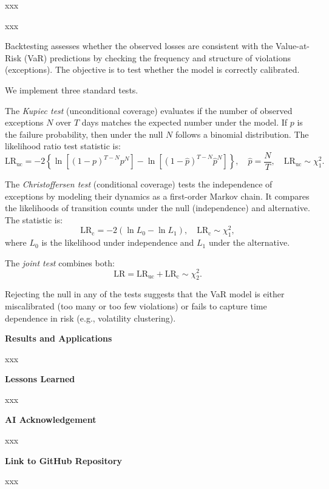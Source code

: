 \documentclass[12pt]{article}
\begin{document}
\vspace{1em}
\underline{}

\vspace{0.6em}

xxx

\vspace{1em}
\underline{}

\vspace{0.6em}

xxx

\vspace{1em}
\underline{}

\vspace{0.6em}

Backtesting assesses whether the observed losses are consistent with the Value-at-Risk (VaR) predictions by checking the frequency and structure of violations (exceptions). The objective is to test whether the model is correctly calibrated.

We implement three standard tests.

The \textit{Kupiec test} (unconditional coverage) evaluates if the number of observed exceptions $N$ over $T$ days matches the expected number under the model. If $p$ is the failure probability, then under the null $N$ follows a binomial distribution. The likelihood ratio test statistic is:
\[
\text{LR}_{\text{uc}} = -2 \left\{ \ln\left[(1 - p)^{T - N} p^N \right] - \ln\left[(1 - \hat{p})^{T - N} \hat{p}^N \right] \right\}, \quad \hat{p} = \frac{N}{T}, \quad \text{LR}_{\text{uc}} \sim \chi^2_1.
\]

The \textit{Christoffersen test} (conditional coverage) tests the independence of exceptions by modeling their dynamics as a first-order Markov chain. It compares the likelihoods of transition counts under the null (independence) and alternative. The statistic is:
\[
\text{LR}_{\text{c}} = -2 (\ln L_0 - \ln L_1), \quad \text{LR}_{\text{c}} \sim \chi^2_1,
\]
where $L_0$ is the likelihood under independence and $L_1$ under the alternative.

The \textit{joint test} combines both:
\[
\text{LR} = \text{LR}_{\text{uc}} + \text{LR}_{\text{c}} \sim \chi^2_2.
\]

Rejecting the null in any of the tests suggests that the VaR model is either miscalibrated (too many or too few violations) or fails to capture time dependence in risk (e.g., volatility clustering).



\textbf{Results and Applications}

xxx

\textbf{Lessons Learned}

xxx

\textbf{AI Acknowledgement}

xxx

\textbf{Link to GitHub Repository}

xxx
\end{document}
